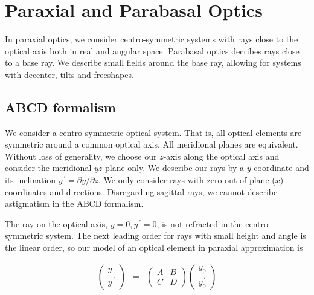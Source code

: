 \documentclass[12pt,a4paper,twoside,openright,BCOR10mm,headsepline,titlepage,abstracton,chapterprefix,final]{scrreprt}
\begin{document}
\section{Paraxial and Parabasal Optics}
In paraxial optics, we consider centro-symmetric systems with rays close to the optical axis both in real and angular space. 
Parabasal optics decribes rays close to a base ray. 
We describe small fields around the base ray,
allowing for systems with decenter, tilts and freeshapes. 

\subsection{ABCD formalism}
We consider a centro-symmetric optical system. 
That is, all optical elements are symmetric around a common optical axis.
All meridional planes are equivalent.
Without loss of generality, we choose our $z$-axis along the optical axis and consider the meridional $yz$ plane only.
We describe our rays by a $y$ coordinate and its inclination $y^{\,\prime} = \partial y / \partial z$. 
We only consider rays with zero out of plane ($x$) coordinates and directions.
Disregarding sagittal rays, we cannot describe astigmatism in the ABCD formalism.

The ray on the optical axis, $y=0, y^{\,\prime}=0$, is not refracted in the centro-symmetric system.
The next leading order for rays with small height and angle is the linear order, so our model of an optical element in paraxial approximation is

\begin{eqnarray}
 \begin{pmatrix}
  y \\ y^{\,\prime}
 \end{pmatrix}
 &=&
 \begin{pmatrix}
  A & B \\ C & D
 \end{pmatrix}
 \begin{pmatrix}
  y_0 \\ y_0^{\,\prime}
 \end{pmatrix}
\end{eqnarray}
\end{document}
